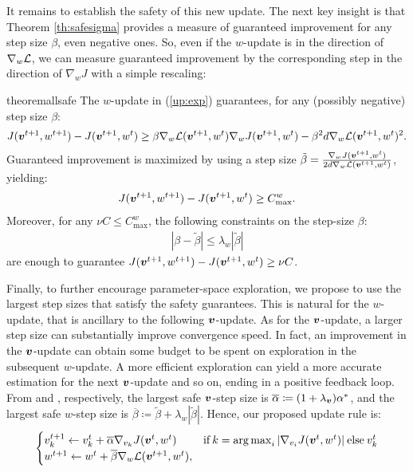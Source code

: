 It remains to establish the safety of this new update. 
The next key insight is that Theorem \ref{th:safesigma} provides a measure of guaranteed improvement for any step size $\beta$, even negative ones. So, even if the $w$-update is in the direction of $\gradDelta$, we can measure guaranteed improvement by the corresponding step in the direction of $\nabla_{w}J$ with a simple rescaling:
\begin{restatable}[]{theorem}{allsafe}\label{th:safe_exp}
	The $w$-update in (\ref{up:exp}) guarantees, for any (possibly negative) step size $\beta$:
	\begin{align*}
	J(\vv^{t+1},w^{t+1}) - J(\vv^{t+1},w^t) \geq \beta\gradDelta(\vv^{t+1},w^t)\gradJ[w]{\vv^{t+1},w^t}-
	\beta^2 d \gradDelta(\vv^{t+1},w^t)^2.
	\end{align*}
	Guaranteed improvement is maximized by using a step size $\tilde{\beta} =\frac{\gradJ[w]{\vv^{t+1},w^t}}{2d\gradDelta(\vv^{t+1},w^t)}$, yielding:
	\begin{align*}
	J(\vv^{t+1},w^{t+1}) - J(\vv^{t+1}, w^t) \geq C_{\text{max}}^w. 
	\end{align*}
	Moreover, for any $\nu C\leq C_{\text{max}}^{w}$, the following constraints on the step-size $\beta$:
	\begin{align}\label{stat:4_3}
	|\beta - \tilde{\beta}| \leq \lambda_{w}|\tilde{\beta}|
	\end{align}
	are enough to guarantee $J(\vv^{t+1},w^{t+1}) - J(\vv^{t+1},w^t)\geq \nu C$.
\end{restatable}
%
Finally, to further encourage parameter-space exploration, we propose to use the largest step sizes that satisfy the safety guarantees. This is natural for the $w$-update, that is ancillary to the following $\vv$-update. As for the $\vv$-update, a larger step size can substantially improve convergence speed. In fact, an improvement in the $\vv$-update can obtain some budget to be spent on exploration in the subsequent $w$-update. A more efficient exploration can yield a more accurate estimation for the next $\vv$-update and so on, ending in a positive feedback loop. \\
From  and , respectively, the largest safe $\vv$-step size is $\overline{\alpha}\coloneqq(1+\lambda_{\vv})\alpha^*$, and the largest safe $w$-step size is $\overline{\beta}\coloneqq\tilde{\beta} + \lambda_{w}|\tilde{\beta}|$. Hence, our proposed update rule is:
%
\begin{align}\label{up:morexp}
\begin{cases}
v_{k}^{t+1} \gets v_{k}^t + \overline{\alpha}\gradJ[v_{k}]{\vv^t,w^t}
& \text{if}\:k =  \argmax_i |\gradJ[v_i]{\vv^t, w^t}| \:\text{else}\:v_{k}^t\\
w^{t+1} \gets w^t + \overline{\beta}\gradDelta(\vv^{t+1}, w^t),
\end{cases}
\end{align}

